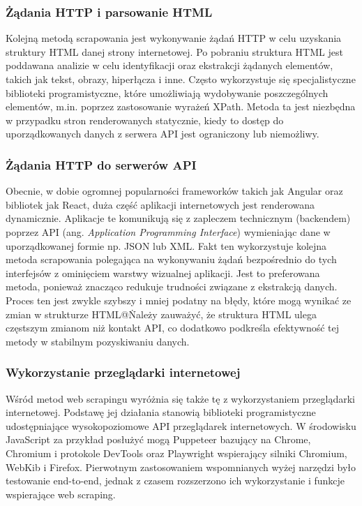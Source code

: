 \subsubsection{Żądania HTTP i parsowanie HTML}

Kolejną metodą scrapowania jest wykonywanie żądań HTTP w celu uzyskania struktury HTML danej strony internetowej.
Po pobraniu struktura HTML jest poddawana analizie w celu identyfikacji oraz ekstrakcji żądanych elementów, takich jak tekst, obrazy, hiperłącza i inne.
Często wykorzystuje się specjalistyczne biblioteki programistyczne, które umożliwiają wydobywanie poszczególnych elementów, m.in. poprzez zastosowanie wyrażeń XPath.
Metoda ta jest niezbędna w przypadku stron renderowanych statycznie, kiedy to dostęp do uporządkowanych danych z serwera API jest ograniczony lub niemożliwy.

\subsubsection{Żądania HTTP do serwerów API}

Obecnie, w dobie ogromnej popularności frameworków takich jak Angular oraz bibliotek jak React, duża część aplikacji internetowych jest renderowana dynamicznie.
Aplikacje te komunikują się z zapleczem technicznym (backendem) poprzez API (ang. \emph{Application Programming Interface}) wymieniając dane w uporządkowanej formie np. JSON lub XML.
Fakt ten wykorzystuje kolejna metoda scrapowania polegająca na wykonywaniu żądań bezpośrednio do tych interfejsów z ominięciem warstwy wizualnej aplikacji.
Jest to preferowana metoda, ponieważ znacząco redukuje trudności związane z ekstrakcją danych.
Proces ten jest zwykle szybszy i mniej podatny na błędy, które mogą wynikać ze zmian w strukturze HTML@\.
Należy zauważyć, że struktura HTML ulega częstszym zmianom niż kontakt API, co dodatkowo podkreśla efektywność tej metody w stabilnym pozyskiwaniu danych.

\subsubsection{Wykorzystanie przeglądarki internetowej}\label{subsubsec:browser-scraping-theory}

Wśród metod web scrapingu wyróżnia się także tę z wykorzystaniem przeglądarki internetowej.
Podstawę jej działania stanowią biblioteki programistyczne udostępniające wysokopoziomowe API przeglądarek internetowych.
W środowisku JavaScript za przykład posłużyć mogą Puppeteer bazujący na Chrome, Chromium i protokole DevTools
oraz Playwright wspierający silniki Chromium, WebKib i Firefox.
Pierwotnym zastosowaniem wspomnianych wyżej narzędzi było testowanie end-to-end, jednak z czasem rozszerzono ich wykorzystanie i funkcje wspierające web scraping.

